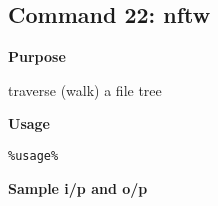\subsection{Command 22: nftw} 
\textbf{Purpose}
\begin{flushleft}
 traverse (walk) a file tree
\end{flushleft}
\textbf{Usage}
\begin{verbatim}
%usage%
\end{verbatim}
\textbf{Sample i/p and o/p}
\begin{figure}[H] 
\end{figure}
